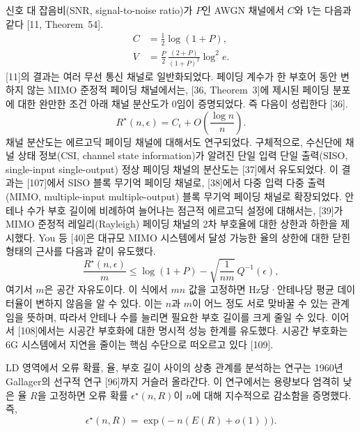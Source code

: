 신호 대 잡음비(SNR, signal-to-noise ratio)가 $P$인 AWGN 채널에서 $C$와 $V$는 다음과 같다 [11, Theorem~54].
\begin{align}
C &= \frac{1}{2}\log(1+P), \tag{27}\\
V &= \frac{P}{2}\,\frac{(2+P)}{(1+P)^2}\log^2 e. \tag{28}
\end{align}
[11]의 결과는 여러 무선 통신 채널로 일반화되었다. 페이딩 계수가 한 부호어 동안 변하지 않는 MIMO 준정적 페이딩 채널에서는, [36, Theorem~3]에 제시된 페이딩 분포에 대한 완만한 조건 아래 채널 분산도가 0임이 증명되었다. 즉 다음이 성립한다 [36].
\begin{equation}
R^\star(n,\epsilon)=C_\epsilon+O\!\left(\frac{\log n}{n}\right). \tag{29}
\end{equation}
채널 분산도는 에르고딕 페이딩 채널에 대해서도 연구되었다. 구체적으로, 수신단에 채널 상태 정보(CSI, channel state information)가 알려진 단일 입력 단일 출력(SISO, single-input single-output) 정상 페이딩 채널의 분산도는 [37]에서 유도되었다. 이 결과는 [107]에서 SISO 블록 무기억 페이딩 채널로, [38]에서 다중 입력 다중 출력(MIMO, multiple-input multiple-output) 블록 무기억 페이딩 채널로 확장되었다. 안테나 수가 부호 길이에 비례하여 늘어나는 점근적 에르고딕 설정에 대해서는, [39]가 MIMO 준정적 레일리(Rayleigh) 페이딩 채널의 2차 부호율에 대한 상한과 하한을 제시했다. You 등 [40]은 대규모 MIMO 시스템에서 달성 가능한 율의 상한에 대한 닫힌 형태의 근사를 다음과 같이 유도했다.
\begin{equation}
\frac{R^\star(n,\epsilon)}{m}\le\log(1+P)-\sqrt{\frac{1}{nm}}\,Q^{-1}(\epsilon), \tag{30}
\end{equation}
여기서 $m$은 공간 자유도이다. 이 식에서 $mn$ 값을 고정하면 Hz당·안테나당 평균 데이터율이 변하지 않음을 알 수 있다. 이는 $n$과 $m$이 어느 정도 서로 맞바꿀 수 있는 관계임을 뜻하며, 따라서 안테나 수를 늘리면 필요한 부호 길이를 크게 줄일 수 있다. 이어서 [108]에서는 시공간 부호화에 대한 명시적 성능 한계를 유도했다. 시공간 부호화는 6G 시스템에서 지연을 줄이는 핵심 수단으로 떠오르고 있다 [109].

LD 영역에서 오류 확률, 율, 부호 길이 사이의 상충 관계를 분석하는 연구는 1960년 Gallager의 선구적 연구 [96]까지 거슬러 올라간다. 이 연구에서는 용량보다 엄격히 낮은 율 $R$을 고정하면 오류 확률 $\epsilon^\star(n,R)$이 $n$에 대해 지수적으로 감소함을 증명했다. 즉,
\begin{equation}
\epsilon^\star(n,R)=\exp\bigl(-n(E(R)+o(1))\bigr). \tag{31}
\end{equation}

